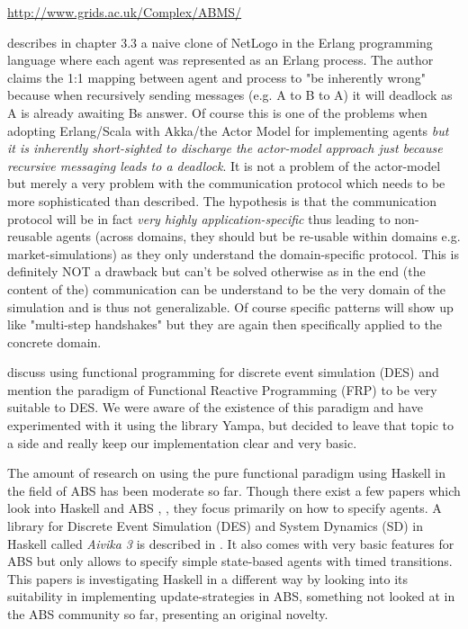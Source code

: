 \url{http://www.grids.ac.uk/Complex/ABMS/}

\cite{Bezirgiannis2013} describes in chapter 3.3 a naive clone of NetLogo in the Erlang programming language where each agent was represented as an Erlang process. The author claims the 1:1 mapping between agent and process to "be inherently wrong" because when recursively sending messages (e.g. A to B to A) it will deadlock as A is already awaiting Bs answer. Of course this is one of the problems when adopting Erlang/Scala with Akka/the Actor Model for implementing agents \textit{but it is inherently short-sighted to discharge the actor-model approach just because recursive messaging leads to a deadlock}. It is not a problem of the actor-model but merely a very problem with the communication protocol which needs to be more sophisticated than \cite{Bezirgiannis2013} described. The hypothesis is that the communication protocol will be in fact \textit{very highly application-specific} thus leading to non-reusable agents (across domains, they should but be re-usable within domains e.g. market-simulations) as they only understand the domain-specific protocol. This is definitely NOT a drawback but can't be solved otherwise as in the end (the content of the) communication can be understand to be the very domain of the simulation and is thus not generalizable. Of course specific patterns will show up like "multi-step handshakes" but they are again then specifically applied to the concrete domain.

\cite{jankovic_functional_2007} discuss using functional programming for discrete event simulation (DES) and mention the paradigm of Functional Reactive Programming (FRP) to be very suitable to DES. We were aware of the existence of this paradigm and have experimented with it using the library Yampa, but decided to leave that topic to a side and really keep our implementation clear and very basic.

The amount of research on using the pure functional paradigm using Haskell in the field of ABS has been moderate so far. Though there exist a few papers which look into Haskell and ABS \cite{de_jong_suitability_2014}, \cite{sulzmann_specifying_2007}, \cite{jankovic_functional_2007} they focus primarily on how to specify agents. A library for Discrete Event Simulation (DES) and System Dynamics (SD) in Haskell called \textit{Aivika 3} is described in \cite{sorokin_aivika_2015}. It also comes with very basic features for ABS but only allows to specify simple state-based agents with timed transitions. This papers is investigating Haskell in a different way by looking into its suitability in implementing update-strategies in ABS, something not looked at in the ABS community so far, presenting an original novelty.

